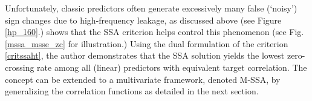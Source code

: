 \documentclass[11pt,a4paper]{article}
\begin{document}
Unfortunately, classic predictors often generate excessively many false (`noisy') sign changes due to high-frequency leakage, as discussed above (see Figure \ref{hp_160}.)
 \cite{Wildi2025} shows that the SSA criterion helps control this phenomenon (see Fig.\ref{mssa_msse_zc} for illustration.) Using the dual formulation of the criterion \eqref{critssaht}, the author demonstrates that the SSA solution yields the lowest zero-crossing rate among all (linear) predictors with equivalent target correlation.
The concept can be extended to a multivariate framework, denoted M-SSA, by generalizing the correlation functions as detailed in the next section.\\
\end{document}
